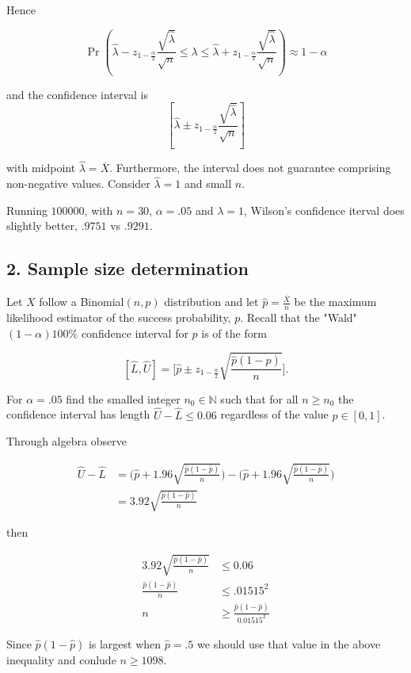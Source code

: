 \documentclass{tufte-book}
\begin{document}
Hence

\[ \Pr(\hat{\lambda} - z_{1-\frac{\alpha}{2}}\frac{\sqrt{\hat{\lambda}}}{\sqrt{n}} \leq \lambda \leq \hat{\lambda} + z_{1-\frac{\alpha}{2}}\frac{\sqrt{\hat{\lambda}}}{\sqrt{n}}) \approx 1-\alpha \]

and the confidence interval is
\[ [ \hat{\lambda} \pm z_{1-\frac{\alpha}{2}}\frac{\sqrt{\hat{\lambda}}}{\sqrt{n}} ] \]

with midpoint $\hat{\lambda}=\overline{X}$.  Furthermore, the interval does not guarantee comprising non-negative values.  Consider $\hat{\lambda}=1$ and small $n$.

Running  $100000$, with $n=30$, $\alpha=.05$ and $\lambda=1$, Wilson's confidence iterval does slightly better, $.9751$ vs $.9291$.


\subsection{2. Sample size determination}
Let $X$ follow a Binomial$(n,p)$ distribution and let $\hat{p}=\frac{\overline{X}}{n}$ be the maximum likelihood estimator of the success probability, $p$. Recall that the "Wald" $(1-\alpha)100\%$ confidence interval for $p$ is of the form

\[ [\hat{L}, \hat{U}] = \Big[ \hat{p} \pm z_{1-\frac{\alpha}{2}} \sqrt{\frac{\hat{p}(1-\hat{p})}{n}} \Big]. \]

For $\alpha=.05$ find the smalled integer $n_0 \in \mathbb{N}$ such that for all $n \geq n_0$ the confidence interval has length $\hat{U} - \hat{L} \leq 0.06$ regardless of the value $p \in [0,1]$.

Through algebra observe

\begin{align*}
\hat{U} - \hat{L} &= \big(\hat{p} + 1.96 \sqrt{\frac{\hat{p}(1-\hat{p})}{n}}\big) - \big(\hat{p} + 1.96 \sqrt{\frac{\hat{p}(1-\hat{p})}{n}}\big)\\
&= 3.92 \sqrt{\frac{\hat{p}(1-\hat{p})}{n}}
\end{align*}

then

\begin{align*}
3.92 \sqrt{\frac{\hat{p}(1-\hat{p})}{n}} &\leq 0.06\\
\frac{\hat{p}(1-\hat{p})}{n} &\leq .01515^2\\
n &\geq \frac{\hat{p}(1-\hat{p})}{0.01515^2}
\end{align*}

Since $\hat{p}(1-\hat{p})$ is largest when $\hat{p}=.5$ we should use that value in the above inequality and conlude $n\geq 1098$.
\end{document}
